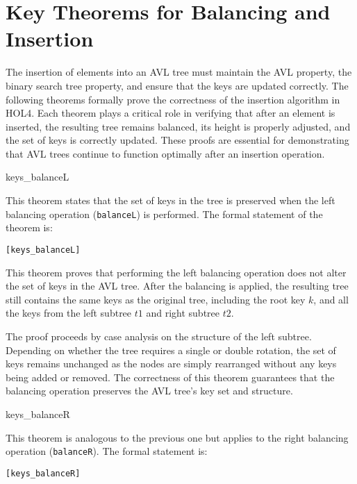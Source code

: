 \chapter{Key Theorems for Balancing and Insertion}\label{chap:LaTeXAdvice}

The insertion of elements into an AVL tree must maintain the AVL property, the binary search tree property, and ensure that the keys are updated correctly. The following theorems formally prove the correctness of the insertion algorithm in HOL4. Each theorem plays a critical role in verifying that after an element is inserted, the resulting tree remains balanced, its height is properly adjusted, and the set of keys is correctly updated. These proofs are essential for demonstrating that AVL trees continue to function optimally after an insertion operation.

\begin{thm}{keys\_balanceL}

This theorem states that the set of keys in the tree is preserved when the left balancing operation (\texttt{balanceL}) is performed. The formal statement of the theorem is:


\begin{alltt}
	[keys_balanceL]
\end{alltt}


\end{thm}
This theorem proves that performing the left balancing operation does not alter the set of keys in the AVL tree. After the balancing is applied, the resulting tree still contains the same keys as the original tree, including the root key \( k \), and all the keys from the left subtree \( t1 \) and right subtree \( t2 \).

The proof proceeds by case analysis on the structure of the left subtree. Depending on whether the tree requires a single or double rotation, the set of keys remains unchanged as the nodes are simply rearranged without any keys being added or removed. The correctness of this theorem guarantees that the balancing operation preserves the AVL tree's key set and structure.
\begin{thm}{keys\_balanceR}

This theorem is analogous to the previous one but applies to the right balancing operation (\texttt{balanceR}). The formal statement is:

\begin{alltt}
	[keys_balanceR]
\end{alltt}
\end{thm}

